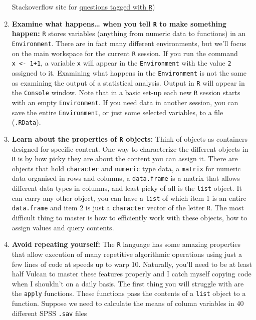\documentclass[]{book}
\begin{document}
\begin{enumerate}
  Stackoverflow site for
  \href{http://stackoverflow.com/questions/tagged/r}{questions tagged
  with \texttt{R}})
\item
  \textbf{Examine what happens\ldots{} when you tell \texttt{R} to make
  something happen:} \texttt{R} stores variables (anything from numeric
  data to functions) in an \texttt{Environment}. There are in fact many
  different environments, but we'll focus on the main workspace for the
  current \texttt{R} session. If you run the command
  \texttt{x\ \textless{}-\ 1+1}, a variable \texttt{x} will appear in
  the \texttt{Environment} with the value \texttt{2} assigned to it.
  Examining what happens in the \texttt{Environment} is not the same as
  examining the output of a statistical analysis. Output in \texttt{R}
  will appear in the \texttt{Console} window. Note that in a basic
  set-up each new \texttt{R} session starts with an empty
  \texttt{Environment}. If you need data in another session, you can
  save the entire \texttt{Environment}, or just some selected variables,
  to a file (\texttt{.RData}).
\item
  \textbf{Learn about the properties of \texttt{R} objects:} Think of
  objects as containers designed for specific content. One way to
  characterize the different objects in \texttt{R} is by how picky they
  are about the content you can assign it. There are objects that hold
  \texttt{character} and \texttt{numeric} type data, a \texttt{matrix}
  for numeric data organised in rows and columns, a \texttt{data.frame}
  is a matrix that allows different data types in columns, and least
  picky of all is the \texttt{list} object. It can carry any other
  object, you can have a \texttt{list} of which item 1 is an entire
  \texttt{data.frame} and item 2 is just a \texttt{character} vector of
  the letter \texttt{R}. The most difficult thing to master is how to
  efficiently work with these objects, how to assign values and query
  contents.
\item
  \textbf{Avoid repeating yourself:} The \texttt{R} language has some
  amazing properties that allow execution of many repetitive algorithmic
  operations using just a few lines of code at speeds up to warp 10.
  Naturally, you'll need to be at least half Vulcan to master these
  features properly and I catch myself copying code when I shouldn't on
  a daily basis. The first thing you will struggle with are the
  \texttt{apply} functions. These functions pass the contents of a
  \texttt{list} object to a function. Suppose we need to calculate the
  means of column variables in 40 different SPSS \texttt{.sav} files

\end{enumerate}
\end{document}
